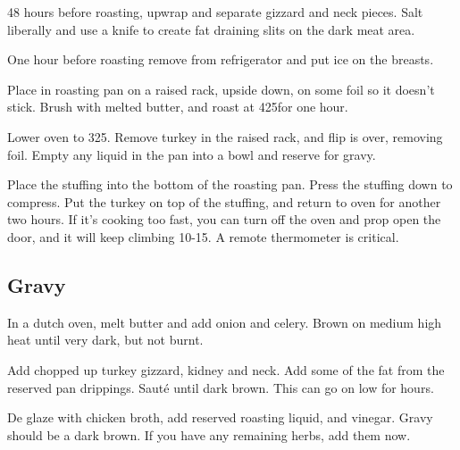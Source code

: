 \begin{recipe}
48 hours before roasting, upwrap and separate gizzard and neck pieces. Salt liberally and use a knife to create fat draining slits on the dark meat area. 

One hour before roasting remove from refrigerator and put ice on the breasts. 

Place in roasting pan on a raised rack, upside down, on some foil so it doesn't stick. Brush with melted butter, and roast at 425\degree for one hour.

Lower oven to 325\degree. Remove turkey in the raised rack, and flip is over, removing foil. Empty any liquid in the pan into a bowl and reserve for gravy.

Place the stuffing into the bottom of the roasting pan. Press the stuffing down to compress. Put the  turkey on top of the stuffing, and return to oven for another two hours. If it's cooking too fast, you can turn off the oven and prop open the door, and it will keep climbing 10-15\degree. A remote thermometer is critical. 

\newpage
\subsection{Gravy}



In a dutch oven, melt butter and add onion and celery. Brown on medium high heat until very dark, but not burnt.

Add chopped up turkey gizzard, kidney and neck. Add some of the fat from the reserved pan drippings. Sauté until dark brown. This can go on low for hours.


De glaze with chicken broth, add reserved roasting liquid, and vinegar. Gravy should be a dark brown. If you have any remaining herbs, add them now.


\end{recipe}
